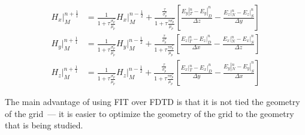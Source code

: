     \begin{align}
        H_x|_M^{n+\frac{1}{1}} &= \frac{1}{1 + \tau\frac{\sigma_p^*}{\mu_p}}H_x|_M^{n-\frac{1}{2}} + \frac{\frac{\tau}{\sigma_p^*}}{1+\tau\frac{\tau\sigma_p^*}{\mu_p}}\left[ \frac{E_y|_T^n - E_y|_D^n}{\Delta z} - \frac{E_z|_N^n - E_z|_S^n}{\Delta y}\right]\\
        H_y|_M^{n+\frac{1}{1}} &= \frac{1}{1 + \tau\frac{\sigma_p^*}{\mu_p}}H_y|_M^{n-\frac{1}{2}} + \frac{\frac{\tau}{\sigma_p^*}}{1+\tau\frac{\tau\sigma_p^*}{\mu_p}}\left[\frac{E_z|_T^n - E_z|_D^n}{\Delta x} - \frac{E_x|_N^n - E_x|_S^n}{\Delta z}\right]\\
        H_z|_M^{n+\frac{1}{1}} &= \frac{1}{1 + \tau\frac{\sigma_p^*}{\mu_p}}H_z|_M^{n-\frac{1}{2}} + \frac{\frac{\tau}{\sigma_p^*}}{1+\tau\frac{\tau\sigma_p^*}{\mu_p}}\left[\frac{E_x|_T^n - E_x|_D^n}{\Delta y} - \frac{E_y|_N^n - E_y|_S^n}{\Delta x}\right]
    \end{align}

    The main advantage of using FIT over FDTD is that it is not tied the geometry of the grid~--- it is easier to optimize the geometry of the grid to the
    geometry that is being studied.


\clearpage
